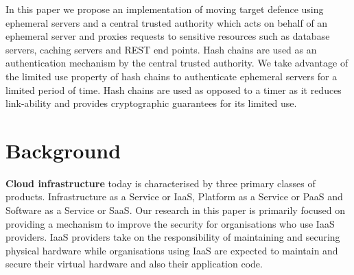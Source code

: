 \documentclass[a4paper,twoside]{article}
\begin{document}
In this paper we propose an implementation of moving target defence using ephemeral servers and a central trusted authority which acts on behalf of an ephemeral server and proxies requests to sensitive resources such as database servers, caching servers and REST end points. Hash chains are used as an authentication mechanism by the central trusted authority. We take advantage of the limited use property of hash chains to authenticate ephemeral servers for a limited period of time. Hash chains are used as opposed to a timer as it reduces link-ability and provides cryptographic guarantees for its limited use.

\section{Background}
\textbf{Cloud infrastructure} today is characterised by three primary classes of products. Infrastructure as a Service or IaaS, Platform as a Service or PaaS and Software as a Service or SaaS. Our research in this paper is primarily focused on providing a mechanism to improve the security for organisations who use IaaS providers.  IaaS providers take on the responsibility of maintaining and securing physical hardware while organisations using IaaS are expected to maintain and secure their virtual hardware and also their application code. 
\end{document}
